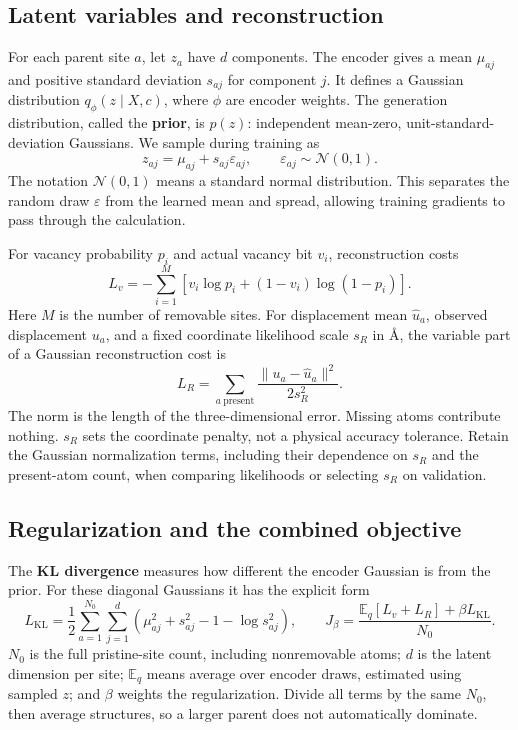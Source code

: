 \subsection*{Latent variables and reconstruction}
For each parent site $a$, let $z_a$ have $d$ components. The encoder gives a mean $\mu_{aj}$ and positive standard deviation $s_{aj}$ for component $j$. It defines a Gaussian distribution $q_\phi(z\mid X,c)$, where $\phi$ are encoder weights. The generation distribution, called the \textbf{prior}, is $p(z)$: independent mean-zero, unit-standard-deviation Gaussians. We sample during training as
\[
 z_{aj}=\mu_{aj}+s_{aj}\varepsilon_{aj},\qquad \varepsilon_{aj}\sim\mathcal N(0,1).
\]
The notation $\mathcal N(0,1)$ means a standard normal distribution. This separates the random draw $\varepsilon$ from the learned mean and spread, allowing training gradients to pass through the calculation.

For vacancy probability $p_i$ and actual vacancy bit $v_i$, reconstruction costs
\[
 L_v=-\sum_{i=1}^{M}\left[v_i\log p_i+(1-v_i)\log(1-p_i)\right].
\]
Here $M$ is the number of removable sites. For displacement mean $\widehat u_a$, observed displacement $u_a$, and a fixed coordinate likelihood scale $s_R$ in \AA, the variable part of a Gaussian reconstruction cost is
\[
 L_R=\sum_{a\ \mathrm{present}}\frac{\|u_a-\widehat u_a\|^2}{2s_R^2}.
\]
The norm is the length of the three-dimensional error. Missing atoms contribute nothing. $s_R$ sets the coordinate penalty, not a physical accuracy tolerance. Retain the Gaussian normalization terms, including their dependence on $s_R$ and the present-atom count, when comparing likelihoods or selecting $s_R$ on validation.

\subsection*{Regularization and the combined objective}
The \textbf{KL divergence} measures how different the encoder Gaussian is from the prior. For these diagonal Gaussians it has the explicit form
\[
 L_{\mathrm{KL}}=\frac12\sum_{a=1}^{N_0}\sum_{j=1}^{d}
 \left(\mu_{aj}^{2}+s_{aj}^{2}-1-\log s_{aj}^{2}\right),\qquad
 J_\beta=\frac{\mathbb E_q[L_v+L_R]+\beta L_{\mathrm{KL}}}{N_0}.
\]
$N_0$ is the full pristine-site count, including nonremovable atoms; $d$ is the latent dimension per site; $\mathbb E_q$ means average over encoder draws, estimated using sampled $z$; and $\beta$ weights the regularization. Divide all terms by the same $N_0$, then average structures, so a larger parent does not automatically dominate.

